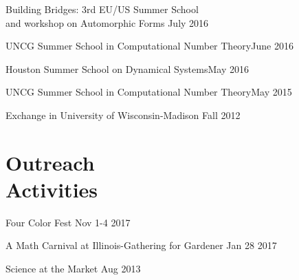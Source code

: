 \documentclass[margin,line,pifont,palatino,courier]{res}
\newenvironment{list1}{
  \begin{list}{\ding{113}}{%
      \setlength{\itemsep}{0in}
      \setlength{\parsep}{0in} \setlength{\parskip}{0in}
      \setlength{\topsep}{0in} \setlength{\partopsep}{0in}
      \setlength{\leftmargin}{0.17in}}}{\end{list}}
\begin{document}
\begin{resume}
\begin{list1}
\item { Building Bridges: 3rd EU/US Summer School \\and workshop on Automorphic Forms} {\hfill  July 2016}
 
\item  UNCG Summer School in Computational Number Theory{\hfill  June 2016}
 
\item  Houston Summer School on Dynamical Systems{\hfill  May 2016}

\item  UNCG Summer School in Computational Number Theory{\hfill  May 2015}

\item  Exchange in {University of Wisconsin-Madison}    {\hfill   Fall 2012}
%	
%
%	
\end{list1}

\section{\sc Outreach \\Activities }
\begin{list1}
\item Four Color Fest {\hfill  Nov 1-4 2017}
\item A Math Carnival at Illinois-Gathering for Gardener  {\hfill  Jan 28 2017}
\item Science at the Market {\hfill  Aug 2013}
\end{list1}

\end{resume}
\end{document}
